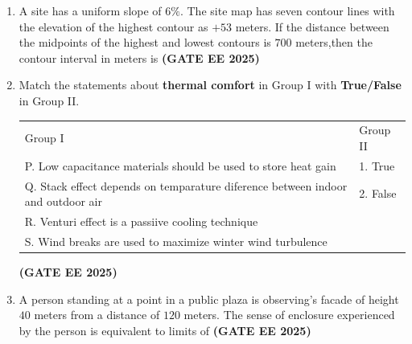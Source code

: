 \documentclass[journal,12pt,onecolumn]{IEEEtran}
\theoremstyle{remark}
\begin{document}
\begin{enumerate}
\begin{enumerate}
\end{enumerate}
\item A site has a uniform slope of $6\%$. The site map has seven contour lines with the elevation of the highest contour as $+53$ meters. If the distance between the midpoints of the highest and lowest contours is $700$ meters,then the contour interval in meters is \hfill \textbf{(GATE EE 2025)}
\begin{enumerate}
\end{enumerate}
\item Match the statements about \textbf{thermal comfort} in Group I with \textbf{True/False} in Group II.
\newline
\begin{tabular}{p{}p{}}
 Group I    & Group II \\
 P. Low capacitance materials should be used to store heat gain   & 1. True\\
 Q. Stack effect depends on temparature diference between indoor and outdoor air & 2. False\\
 R. Venturi effect is a passiive cooling technique & \\
 S. Wind breaks are used to maximize winter wind turbulence & \\
 \end{tabular} \hfill \textbf{(GATE EE 2025)}
 \begin{enumerate}
 \end{enumerate} 
\item  A person standing at a point in a public plaza is observing's facade of height $40$ meters from a distance of $120$ meters. The sense of enclosure experienced by the person is equivalent to limits of \hfill \textbf{(GATE EE 2025)}
\begin{enumerate}
\end{enumerate}
\end{enumerate}
\end{document}
